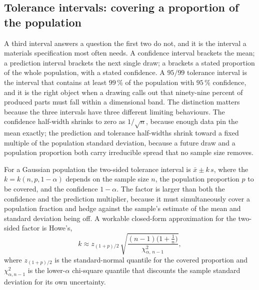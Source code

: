\subsection{Tolerance intervals: covering a proportion of the population}

A third interval answers a question the first two do not, and it is
the interval a materials specification most often needs. A confidence
interval brackets the mean; a prediction interval brackets the next
single draw; a  brackets a stated
proportion of the whole population, with a stated confidence. A
$95/99$ tolerance interval is the interval that contains at least
$99\,\%$ of the population with $95\,\%$ confidence, and it is the
right object when a drawing calls out that ninety-nine percent of
produced parts must fall within a dimensional band. The distinction
matters because the three intervals have three different limiting
behaviours. The confidence half-width shrinks to zero as $1/\sqrt{n}$,
because enough data pin the mean exactly; the prediction and tolerance
half-widths shrink toward a fixed multiple of the population standard
deviation, because a future draw and a population proportion both
carry irreducible spread that no sample size removes.

For a Gaussian population the two-sided tolerance interval is
$\bar{x} \pm k\,s$, where the  $k =
k(n, p, 1-\alpha)$ depends on the sample size $n$, the population
proportion $p$ to be covered, and the confidence $1-\alpha$. The
factor is larger than both the confidence and the prediction
multiplier, because it must simultaneously cover a population fraction
and hedge against the sample's estimate of the mean and standard
deviation being off. A workable closed-form approximation for the
two-sided factor is Howe's,
\[
k \approx z_{(1+p)/2}\,
\sqrt{\frac{(n-1)\bigl(1 + \tfrac{1}{n}\bigr)}
{\chi^{2}_{\alpha,\, n-1}}},
\]
where $z_{(1+p)/2}$ is the standard-normal quantile for the covered
proportion and $\chi^{2}_{\alpha, n-1}$ is the lower-$\alpha$
chi-square quantile that discounts the sample standard deviation for
its own uncertainty.

